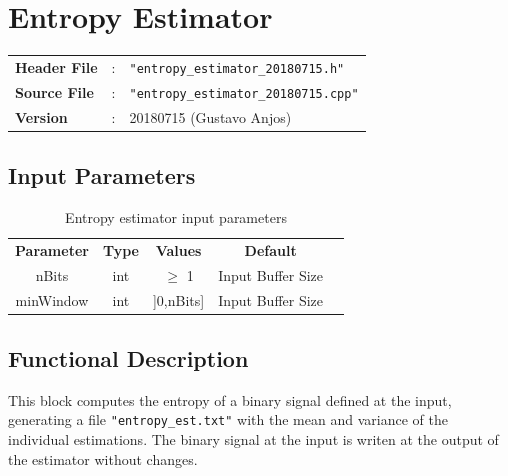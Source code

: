 \clearpage

\section{Entropy Estimator}

\begin{tcolorbox}	
	\begin{tabular}{p{2.75cm} p{0.2cm} p{10.5cm}} 	
		\textbf{Header File}   &:& \texttt{"entropy\_estimator\_20180715.h"} \\
		\textbf{Source File}   &:& \texttt{"entropy\_estimator\_20180715.cpp"} \\
		\textbf{Version}       &:& 20180715 (Gustavo Anjos) \\
	\end{tabular}
\end{tcolorbox}


\subsection*{Input Parameters}

\begin{table}[h]
	\centering
	\begin{tabular}{|c|c|c|c|c|}
		\cline{1-4}
		\textbf{Parameter} & \textbf{Type} &\textbf{Values} &   \textbf{Default}& \\ \cline{1-4}
		nBits 	& int 	& $\geq$ 1 & Input Buffer Size \\ \cline{1-4}
		minWindow	 & int 	& ]0,nBits]  & Input Buffer Size \\ \cline{1-4} \cline{1-4}
	\end{tabular}
	\caption{Entropy estimator input parameters}
	\label{table:estimator_in_par}
\end{table}

\subsection*{Functional Description}
This block computes the entropy of a binary signal defined at the input, generating 
a file \texttt{"entropy\_est.txt"} with the mean and variance of the individual estimations.
The binary signal at the input is writen at the output of the estimator without changes.

